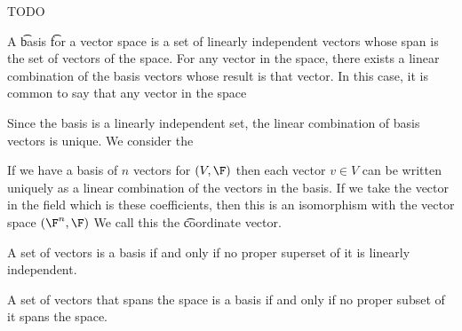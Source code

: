 

TODO


A \t{basis} \t{for} a vector space is a set of linearly independent vectors whose span is the set of vectors of the space.
For any vector in the space, there exists a linear combination of the basis vectors whose result is that vector.
In this case, it is common to say that any vector in the space 

Since the basis is a linearly independent set, the linear combination of basis vectors is unique.
We consider the

If we have a basis of $n$ vectors for $(V, \F)$ then each vector $v \in V$ can be written uniquely as a linear combination of the vectors in the basis.
If we take the vector in the field which is these coefficients, then this is an isomorphism with the vector space $(\F^n, \F)$
We call this the \t{coordinate vector}.


\begin{prop}
  A set of vectors is a basis if and only if no proper superset of it is linearly independent.
\end{prop}

\begin{prop}
  A set of vectors that spans the space is a basis if and only if no proper subset of it spans the space.
\end{prop}

